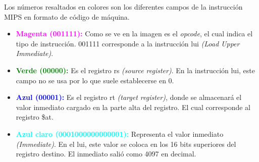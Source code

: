 \documentclass[12pt,letterpaper]{article}
\begin{document}
\begin{enumerate}
  Los números resaltados en colores son los diferentes campos de la instrucción MIPS en formato de código de máquina.

  \begin{itemize}
  \item \textcolor{magenta}{\textbf{Magenta (001111):}} Como se ve en la imagen es el \textit{opcode}, el cual indica el tipo de instrucción. 001111 corresponde a la instrucción lui \textit{(Load Upper Immediate)}.
    
  \item \textcolor{green}{\textbf{Verde (00000):}} Es el registro rs \textit{(source register)}. En la instrucción lui, este campo no se usa por lo que suele establecerse en 0.
    
  \item \textcolor{blue}{\textbf{Azul (00001):}} Es el registro rt \textit{(target register)}, donde se almacenará el valor inmediato cargado en la parte alta del registro. El cual corresponde al registro \$at.

  \item \textcolor{cyan}{\textbf{Azul claro (0001000000000001):}} Representa el valor inmediato \textit{(Immediate)}. En el lui, este valor se coloca en los 16 bits superiores del registro destino. El inmediato salió como 4097 en decimal.
    
  \end{itemize}
  \bigskip
  
\end{enumerate}
\end{document}
